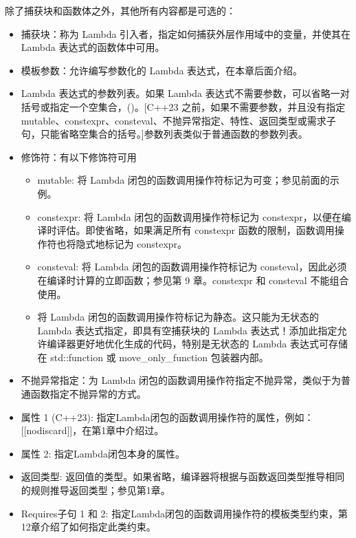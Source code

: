 除了捕获块和函数体之外，其他所有内容都是可选的：

\begin{itemize}
\item
捕获块：称为 Lambda 引入者，指定如何捕获外层作用域中的变量，并使其在 Lambda 表达式的函数体中可用。

\item
模板参数：允许编写参数化的 Lambda 表达式，在本章后面介绍。

\item
Lambda 表达式的参数列表。如果 Lambda 表达式不需要参数，可以省略一对括号或指定一个空集合，()。[C++23 之前，如果不需要参数，并且没有指定 mutable、constexpr、consteval、不抛异常指定、特性、返回类型或需求子句，只能省略空集合的括号。]参数列表类似于普通函数的参数列表。

\item
修饰符：有以下修饰符可用
\begin{itemize}
\item
mutable: 将 Lambda 闭包的函数调用操作符标记为可变；参见前面的示例。

\item
constexpr: 将 Lambda 闭包的函数调用操作符标记为 constexpr，以便在编译时评估。即使省略，如果满足所有 constexpr 函数的限制，函数调用操作符也将隐式地标记为 constexpr。

\item
consteval: 将 Lambda 闭包的函数调用操作符标记为 consteval，因此必须在编译时计算的立即函数；参见第 9 章。constexpr 和 consteval 不能组合使用。

\item
将 Lambda 闭包的函数调用操作符标记为静态。这只能为无状态的 Lambda 表达式指定，即具有空捕获块的 Lambda 表达式！添加此指定允许编译器更好地优化生成的代码，特别是无状态的 Lambda 表达式可存储在 std::function 或 move\_only\_function 包装器内部。

\end{itemize}

\item
不抛异常指定：为 Lambda 闭包的函数调用操作符指定不抛异常，类似于为普通函数指定不抛异常的方式。


\item
属性 1 (C++23): 指定Lambda闭包的函数调用操作符的属性，例如：[[nodiscard]]，在第1章中介绍过。

\item
属性 2: 指定Lambda闭包本身的属性。

\item
返回类型: 返回值的类型。如果省略，编译器将根据与函数返回类型推导相同的规则推导返回类型；参见第1章。

\item
Requires子句 1 和 2: 指定Lambda闭包的函数调用操作符的模板类型约束，第12章介绍了如何指定此类约束。
\end{itemize}

